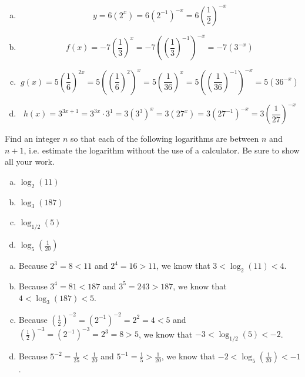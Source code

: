 \documentclass[11pt,letterpaper]{article}
\begin{document}
\sol 
\begin{enumerate}[(a)]
\item 
	\[
	y= 6 (2^x)= 6 (2^{-1})^{-x}= 6 \left( \dfrac{1}{2} \right)^{-x}
	\] \pspace

\item 
	\[
	f(x)= -7 \left( \dfrac{1}{3} \right)^x= -7 \left( \left( \dfrac{1}{3} \right)^{-1} \right)^{-x}= -7 (3^{-x}) 
	\] \pspace

\item 
	\[
	g(x)= 5 \left( \dfrac{1}{6} \right)^{2x}= 5 \left( \left( \dfrac{1}{6} \right)^2 \right)^x= 5 \left( \dfrac{1}{36} \right)^x= 5 \left( \left( \dfrac{1}{36} \right)^{-1} \right)^{-x}= 5 (36^{-x})
	\] \pspace

\item 
	\[
	h(x)= 3^{3x + 1}= 3^{3x} \cdot 3^1= 3 (3^3)^x= 3(27^x)= 3(27^{-1})^{-x}= 3 \left( \dfrac{1}{27} \right)^{-x}
	\]
\end{enumerate}



\newpage



 Find an integer $n$ so that each of the following logarithms are between $n$ and $n + 1$, i.e. estimate the logarithm without the use of a calculator. Be sure to show all your work.
	\begin{enumerate}[(a)]
	\item $\log_2(11)$
	\item $\log_3(187)$
	\item $\log_{1/2}(5)$
	\item $\log_5(\frac{1}{20})$
	\end{enumerate} \pspace

\sol 
\begin{enumerate}[(a)]
\item Because $2^3= 8 < 11$ and $2^4= 16 > 11$, we know that $3 < \log_2(11) < 4$. \pspace

\item Because $3^4= 81 < 187$ and $3^5= 243 > 187$, we know that $4 < \log_3(187) < 5$. \pspace

\item Because $(\frac{1}{2})^{-2}= (2^{-1})^{-2}= 2^2= 4 < 5$ and $(\frac{1}{2})^{-3}= (2^{-1})^{-3}= 2^3= 8 > 5$, we know that $-3 < \log_{1/2}(5) < -2$. \pspace

\item Because $5^{-2}= \frac{1}{25} < \frac{1}{20}$ and $5^{-1}= \frac{1}{5} > \frac{1}{20}$, we know that $-2 < \log_5(\frac{1}{20}) < -1$. 
\end{enumerate}
\end{document}
